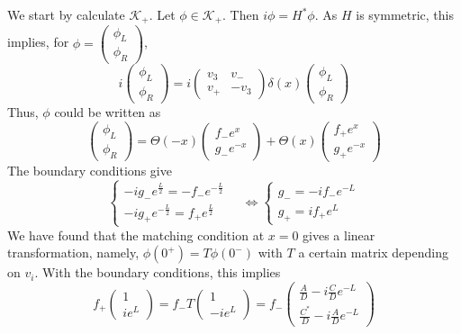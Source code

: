 We start by calculate $\mathcal{K}_+$. Let $\phi \in \mathcal{K}_+$. Then $i \phi = H^* \phi$. As $H$ is symmetric, this implies, for $\phi = \begin{pmatrix} \phi_L \\  \phi_R \end{pmatrix}$, 
\begin{equation}
i \begin{pmatrix} \phi_L \\ \phi_R \end{pmatrix} = 
i \begin{pmatrix} v_3  &  v_-  \\ v_+  &  -v_3 \end{pmatrix} \delta(x)
\begin{pmatrix}  \phi_L  \\  \phi_R \end{pmatrix}
\end{equation} 
Thus, $\phi$ could be written as
\begin{equation}
\begin{pmatrix} \phi_L \\ \phi_R \end{pmatrix} = 
\Theta(-x) \begin{pmatrix} f_- e^x  \\ g_-  e^{-x} \end{pmatrix} + 
\Theta(x) \begin{pmatrix} f_+ e^x  \\ g_+  e^{-x} \end{pmatrix}
\end{equation}
The boundary conditions give
\begin{equation}
\begin{cases}
-i g_- e^{\frac{L}{2}} = - f_- e^{-\frac{L}{2}} \\
-ig_+e^{-\frac{L}{2}} = f_+ e^{\frac{L}{2}}
\end{cases} \quad \Leftrightarrow
\begin{cases}
g_- = -i f_- e^{-L} \\
g_+ = i f_+ e^L
\end{cases}
\end{equation}
We have found that the matching condition at $x=0$ gives a linear transformation, namely, $\phi(0^+) = T\phi(0^-)$ with $T$ a certain matrix depending on $v_i$. With the boundary conditions, this implies
\begin{equation}
f_+ \begin{pmatrix} 1 \\ ie^L \end{pmatrix}
= f_- T \begin{pmatrix} 1 \\ -ie^L \end{pmatrix}
= f_- \begin{pmatrix} \frac{A}{D} - i\frac{C}{D} e^{-L}  \\
\frac{C^*}{D} - i \frac{A}{D} e^{-L} \end{pmatrix}
\end{equation}
